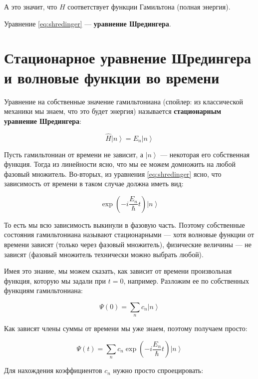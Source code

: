 \documentclass[a4paper, 12pt]{article}
\newcommand{\cat}[1]
{\ensuremath{\left|#1\right\rangle}}
\begin{document}
А это значит, что $H$ соответствует функции Гамильтона (полная энергия).

Уравнение \ref{eq:shredinger} --- \textbf{уравнение Шредингера}.

\section{Стационарное уравнение Шредингера и волновые функции во времени}

Уравнение на собственные значение гамильтониана (спойлер: из классической механики мы знаем, что это будет энергия) называется \textbf{стационарным уравнение Шредингера}:

\begin{equation}
	\hat{H} \cat{n} = E_n \cat{n}
	\label{eq:stationary}
\end{equation}

Пусть гамильтониан от времени не зависит, а $\cat{n}$ --- некоторая его собственная функция. Тогда из линейности ясно, что мы ее можем домножить на любой фазовый множитель. Во-вторых, из уравнения \ref{eq:shredinger} ясно, что зависимость от времени в таком случае должна иметь вид:

\begin{equation*}
	\exp\left(-i \frac{E_n}{\hbar} t\right) \cat{n}
\end{equation*}

То есть мы всю зависимость выкинули в фазовую часть. Поэтому собственные состояния гамильтониана называют стационарными — хотя волновые функции от времени зависят (только через фазовый множитель), физические величины — не зависят (фазовый множитель технически можно выбрать любой).

Имея это знание, мы можем сказать, как зависит от времени произвольная функция, которую мы задали при $t=0$, например. Разложим ее по собственных функциям гамильтониана:

\begin{equation*}
	\Psi(0) = \sum \limits_n c_n \cat{n}
\end{equation*}

Как зависят члены суммы от времени мы уже знаем, поэтому получаем просто:

\begin{equation*}
	\Psi(t) = \sum\limits_n c_n \exp\left(-i \frac{E_n}{\hbar} t\right) \cat{n}
\end{equation*}

Для нахождения коэффициентов $c_n$ нужно просто спроецировать:
\end{document}
